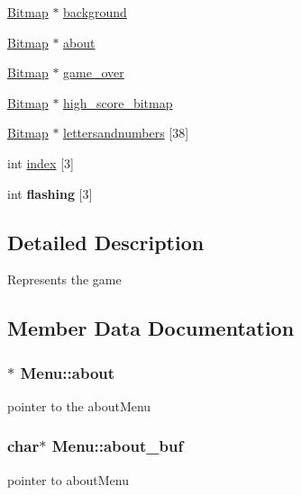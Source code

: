 \begin{DoxyCompactItemize}
\hyperlink{structBitmap}{Bitmap} $\ast$ \hyperlink{structMenu_a557df5703b8c0a3a4096652ab49dcbf4}{background}
\item 
\hyperlink{structBitmap}{Bitmap} $\ast$ \hyperlink{structMenu_a77bac3c0112d559bf29b4efa127bf274}{about}
\item 
\hyperlink{structBitmap}{Bitmap} $\ast$ \hyperlink{structMenu_a72d373e429b2128f377da31eb0a5883f}{game\+\_\+over}
\item 
\hyperlink{structBitmap}{Bitmap} $\ast$ \hyperlink{structMenu_ad58d6c50745792c796c8530eaf0e5118}{high\+\_\+score\+\_\+bitmap}
\item 
\hyperlink{structBitmap}{Bitmap} $\ast$ \hyperlink{structMenu_afb3648c7b0f7daca6b145aca4ef5655b}{lettersandnumbers} \mbox{[}38\mbox{]}
\item 
int \hyperlink{structMenu_ac1b1b1910d8a2190336d4e52681d896f}{index} \mbox{[}3\mbox{]}
\item 
int {\bfseries flashing} \mbox{[}3\mbox{]}\hypertarget{structMenu_ad36d71ee33538da42e648cd241598dbe}{}\label{structMenu_ad36d71ee33538da42e648cd241598dbe}

\end{DoxyCompactItemize}


\subsection{Detailed Description}
Represents the game 

\subsection{Member Data Documentation}
\subsubsection[{\texorpdfstring{about}{about}}]{$\ast$ Menu\+::about}\hypertarget{structMenu_a77bac3c0112d559bf29b4efa127bf274}{}\label{structMenu_a77bac3c0112d559bf29b4efa127bf274}
pointer to the about\+Menu 
\subsubsection[{\texorpdfstring{about\+\_\+buf}{about_buf}}]{\setlength{\rightskip}{0pt plus 5cm}char$\ast$ Menu\+::about\+\_\+buf}\hypertarget{structMenu_a613b9a5b6f1901ea7822770066158de5}{}\label{structMenu_a613b9a5b6f1901ea7822770066158de5}
pointer to about\+Menu 

